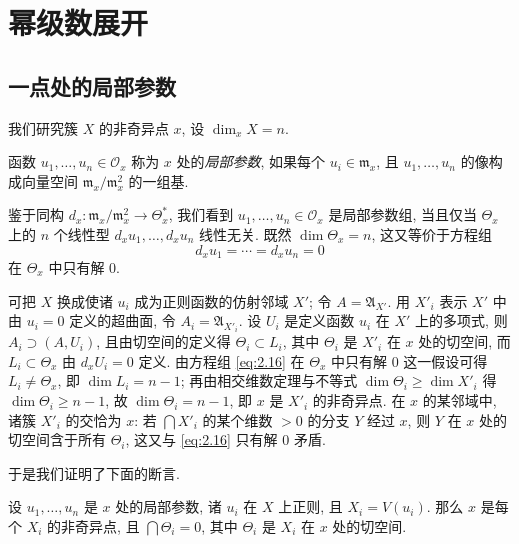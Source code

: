 \section{幂级数展开}

\subsection{一点处的局部参数}

我们研究簇 $X$ 的非奇异点 $x$, 设 $\dim_x X = n$.

\begin{definition}[局部参数]\label{def:local-parameters}
	函数 $u_1, \ldots, u_n \in \mathcal O_x$ 称为 $x$ 处的\emph{局部参数}, 如果每个 $u_i \in \mathfrak m_x$, 且 $u_1, \ldots, u_n$ 的像构成向量空间 $\mathfrak m_x/\mathfrak m_x^2$ 的一组基.
\end{definition}

鉴于同构 $d_x: \mathfrak m_x/\mathfrak m_x^2 \to \Theta_x^*$, 我们看到 $u_1, \ldots, u_n \in \mathcal O_x$ 是局部参数组, 当且仅当 $\Theta_x$ 上的 $n$ 个线性型 $d_x u_1, \ldots, d_x u_n$ 线性无关. 既然 $\dim \Theta_x = n$, 这又等价于方程组
\begin{equation}
	\label{eq:2.16}
	d_x u_1 = \cdots = d_x u_n = 0
\end{equation}
在 $\Theta_x$ 中只有解 $0$.

可把 $X$ 换成使诸 $u_i$ 成为正则函数的仿射邻域 $X'$; 令 $A = \mathfrak A_{X'}$. 用 $X'_i$ 表示 $X'$ 中由 $u_i = 0$ 定义的超曲面, 令 $A_i = \mathfrak A_{X'_i}$. 设 $U_i$ 是定义函数 $u_i$ 在 $X'$ 上的多项式, 则 $A_i \supset (A, U_i)$, 且由切空间的定义得 $\Theta_i \subset L_i$, 其中 $\Theta_i$ 是 $X'_i$ 在 $x$ 处的切空间, 而 $L_i \subset \Theta_x$ 由 $d_x U_i = 0$ 定义. 由方程组 \eqref{eq:2.16} 在 $\Theta_x$ 中只有解 $0$ 这一假设可得 $L_i \ne \Theta_x$, 即 $\dim L_i = n-1$; 再由相交维数定理与不等式 $\dim \Theta_i \ge \dim X'_i$ 得 $\dim \Theta_i \ge n-1$, 故 $\dim \Theta_i = n-1$, 即 $x$ 是 $X'_i$ 的非奇异点. 在 $x$ 的某邻域中, 诸簇 $X'_i$ 的交恰为 $x$: 若 $\bigcap X'_i$ 的某个维数 $> 0$ 的分支 $Y$ 经过 $x$, 则 $Y$ 在 $x$ 处的切空间含于所有 $\Theta_i$, 这又与 \eqref{eq:2.16} 只有解 $0$ 矛盾.

于是我们证明了下面的断言.

\begin{theorem}\label{thm:local-params-transversal}
	设 $u_1, \ldots, u_n$ 是 $x$ 处的局部参数, 诸 $u_i$ 在 $X$ 上正则, 且 $X_i = V(u_i)$. 那么 $x$ 是每个 $X_i$ 的非奇异点, 且 $\bigcap \Theta_i = 0$, 其中 $\Theta_i$ 是 $X_i$ 在 $x$ 处的切空间.
\end{theorem}

